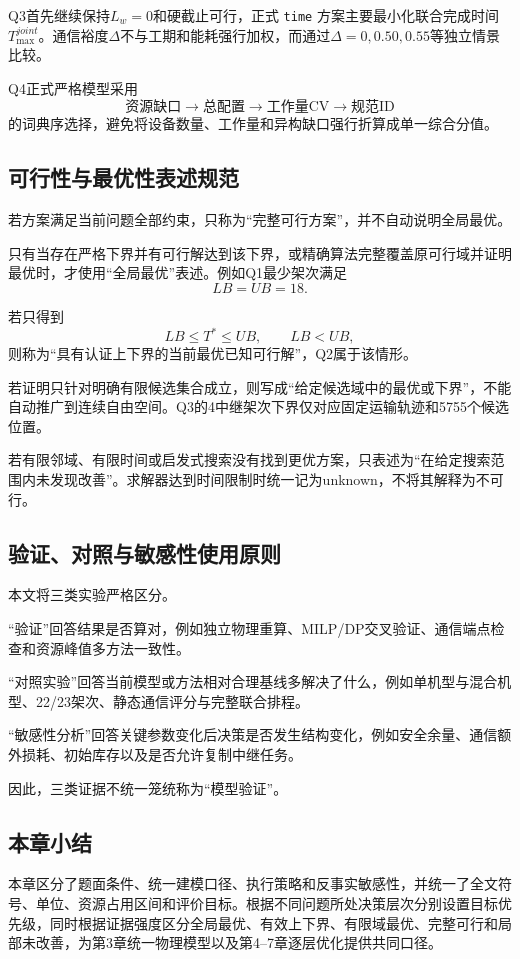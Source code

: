 \documentclass[UTF8,a4paper,12pt]{ctexart}
\begin{document}
Q3首先继续保持$L_w=0$和硬截止可行，正式 \texttt{time} 方案主要最小化联合完成时间 $T_{\max}^{joint}$。通信裕度$\Delta$不与工期和能耗强行加权，而通过$\Delta=0,0.50,0.55$等独立情景比较。

Q4正式严格模型采用
\[
\boxed{
\text{资源缺口}
\rightarrow
\text{总配置}
\rightarrow
\text{工作量CV}
\rightarrow
\text{规范ID}
}
\]
的词典序选择，避免将设备数量、工作量和异构缺口强行折算成单一综合分值。

\subsection{可行性与最优性表述规范}

若方案满足当前问题全部约束，只称为“完整可行方案”，并不自动说明全局最优。

只有当存在严格下界并有可行解达到该下界，或精确算法完整覆盖原可行域并证明最优时，才使用“全局最优”表述。例如Q1最少架次满足
\[
LB=UB=18.
\]

若只得到
\[
LB\le T^*\le UB,\qquad LB<UB,
\]
则称为“具有认证上下界的当前最优已知可行解”，Q2属于该情形。

若证明只针对明确有限候选集合成立，则写成“给定候选域中的最优或下界”，不能自动推广到连续自由空间。Q3的4中继架次下界仅对应固定运输轨迹和5755个候选位置。

若有限邻域、有限时间或启发式搜索没有找到更优方案，只表述为“在给定搜索范围内未发现改善”。求解器达到时间限制时统一记为unknown，不将其解释为不可行。

\subsection{验证、对照与敏感性使用原则}

本文将三类实验严格区分。

“验证”回答结果是否算对，例如独立物理重算、MILP/DP交叉验证、通信端点检查和资源峰值多方法一致性。

“对照实验”回答当前模型或方法相对合理基线多解决了什么，例如单机型与混合机型、22/23架次、静态通信评分与完整联合排程。

“敏感性分析”回答关键参数变化后决策是否发生结构变化，例如安全余量、通信额外损耗、初始库存以及是否允许复制中继任务。

因此，三类证据不统一笼统称为“模型验证”。

\subsection{本章小结}

本章区分了题面条件、统一建模口径、执行策略和反事实敏感性，并统一了全文符号、单位、资源占用区间和评价目标。根据不同问题所处决策层次分别设置目标优先级，同时根据证据强度区分全局最优、有效上下界、有限域最优、完整可行和局部未改善，为第3章统一物理模型以及第4--7章逐层优化提供共同口径。
\end{document}
